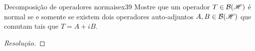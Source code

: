 \begin{exercício}{Decomposição de operadores normais}{ex39}
    Mostre que um operador \(T \in \mathcal{B}(\mathscr{H})\) é normal se e somente se existem dois operadores auto-adjuntos \(A, B \in \mathcal{B}(\mathscr{H})\) que comutam tais que \(T = A + iB.\)
\end{exercício}
\begin{proof}[Resolução]

\end{proof}
